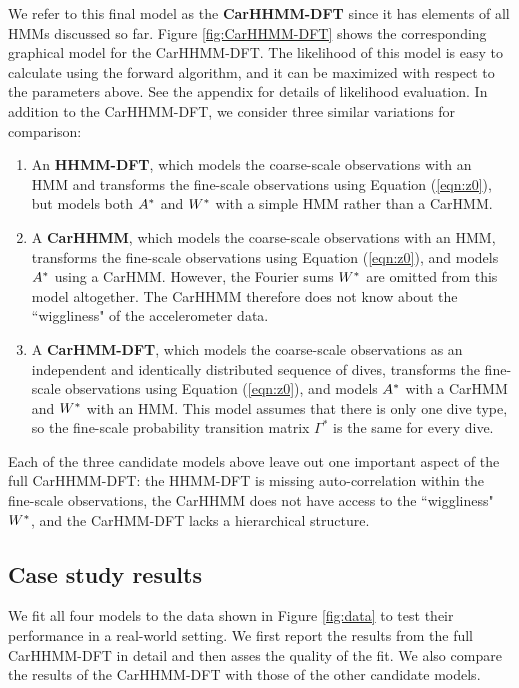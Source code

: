 We refer to this final model as the \textbf{CarHHMM-DFT} since it has elements of all HMMs discussed so far. Figure \ref{fig:CarHHMM-DFT} shows the corresponding graphical model for the CarHHMM-DFT. The likelihood of this model is easy to calculate using the forward algorithm, and it can be maximized with respect to the parameters above. See the appendix for details of likelihood evaluation. In addition to the CarHHMM-DFT, we consider three similar variations for comparison:
\begin{enumerate}
    \item An \textbf{HHMM-DFT}, which models the coarse-scale observations with an HMM and transforms the fine-scale observations using Equation (\ref{eqn:z0}), but models both $A^*$ and $W^*$ with a simple HMM rather than a CarHMM.
    \item A \textbf{CarHHMM}, which models the coarse-scale observations with an HMM, transforms the fine-scale observations using Equation (\ref{eqn:z0}), and models $A^*$ using a CarHMM. However, the Fourier sums $W^*$ are omitted from this model altogether. The CarHHMM therefore does not know about the ``wiggliness" of the accelerometer data.
    \item A \textbf{CarHMM-DFT}, which models the coarse-scale observations as an independent and identically distributed sequence of dives, transforms the fine-scale observations using Equation (\ref{eqn:z0}), and models $A^*$ with a CarHMM and $W^*$ with an HMM. This model assumes that there is only one dive type, so the fine-scale probability transition matrix $\Gamma^*$ is the same for every dive. 
\end{enumerate}
%
Each of the three candidate models above leave out one important aspect of the full CarHHMM-DFT: the HHMM-DFT is missing auto-correlation within the fine-scale observations, the CarHHMM does not have access to the ``wiggliness" $W^*$, and the CarHMM-DFT lacks a hierarchical structure.

\subsection{Case study results}

We fit all four models to the data shown in Figure \ref{fig:data} to test their performance in a real-world setting. We first report the results from the full CarHHMM-DFT in detail and then asses the quality of the fit. We also compare the results of the CarHHMM-DFT with those of the other candidate models.

